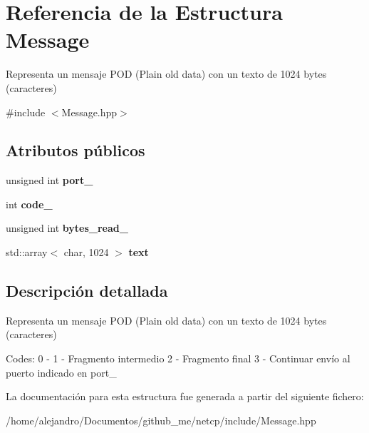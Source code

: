 \hypertarget{structMessage}{}\section{Referencia de la Estructura Message}
\label{structMessage}


Representa un mensaje P\+OD (Plain old data) con un texto de 1024 bytes (caracteres)  




{\ttfamily \#include $<$Message.\+hpp$>$}

\subsection*{Atributos públicos}
\begin{DoxyCompactItemize}
\item 
\mbox{\label{structMessage_a49d3282345f12eef01b6d7b50678ca88}} 
unsigned int {\bfseries port\+\_\+}
\item 
\mbox{\label{structMessage_aaeff602e34763cb97a9fe25d435f7164}} 
int {\bfseries code\+\_\+}
\item 
\mbox{\label{structMessage_ac63acef6d3d9086b1af66708f98b3f8f}} 
unsigned int {\bfseries bytes\+\_\+read\+\_\+}
\item 
\mbox{\label{structMessage_a8398aec0171dec03c496704e79fd0022}} 
std\+::array$<$ char, 1024 $>$ {\bfseries text}
\end{DoxyCompactItemize}


\subsection{Descripción detallada}
Representa un mensaje P\+OD (Plain old data) con un texto de 1024 bytes (caracteres) 

Codes\+: 0 -\/ 1 -\/ Fragmento intermedio 2 -\/ Fragmento final 3 -\/ Continuar envío al puerto indicado en port\+\_\+ 

La documentación para esta estructura fue generada a partir del siguiente fichero\+:\begin{DoxyCompactItemize}
\item 
/home/alejandro/\+Documentos/github\+\_\+me/netcp/include/Message.\+hpp\end{DoxyCompactItemize}
